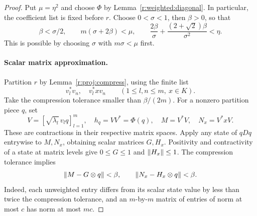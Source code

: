 \begin{proof}
Put \(\mu=\eta^2\) and choose \(\Phi\) by
Lemma~\ref{r:weighted:diagonal}. In particular, the coefficient list is
fixed before \(r\). Choose \(0<\sigma<1\), then \(\beta>0\), so that
\begin{equation}\label{r:eq:block-parameters}
 \beta<\sigma/2,\qquad m(\sigma+2\beta)<\mu,\qquad
 \frac{2\beta}{\sigma}
       +\frac{(2+\sqrt2)\beta}{\sigma^2}<\eta.
\end{equation}
This is possible by choosing \(\sigma\) with \(m\sigma<\mu\) first.

\paragraph{Scalar matrix approximation.}
Partition \(r\) by Lemma~\ref{r:proj:compress}, using the finite list
\[
 v_l^*v_n,\quad v_l^*xv_n
 \qquad(1\leq l,n\leq m,\ x\in K).
\]
Take the compression tolerance smaller than \(\beta/(2m)\).
For a nonzero partition piece \(q\), set
\[
 V=[\sqrt{\lambda_l}\,v_lq]_{l=1}^m,\quad
 h_q=VV^*=\Phi(q),\quad M=V^*V,\quad N_x=V^*xV.
\]
These are contractions in their respective matrix spaces.
Apply any state of \(qDq\) entrywise to \(M,N_x\), obtaining scalar
matrices \(G,H_x\). Positivity and contractivity of a state at matrix
levels give \(0\leq G\leq1\) and \(\lVert H_x\rVert\leq1\).
The compression tolerance implies
\begin{equation}\label{r:eq:scalar-gram}
 \lVert M-G\otimes q\rVert<\beta,\qquad
 \lVert N_x-H_x\otimes q\rVert<\beta.
\end{equation}
Indeed, each unweighted entry differs from its scalar state value by
less than twice the compression tolerance, and an \(m\)-by-\(m\) matrix
of entries of norm at most \(c\) has norm at most \(mc\).


\end{proof}
